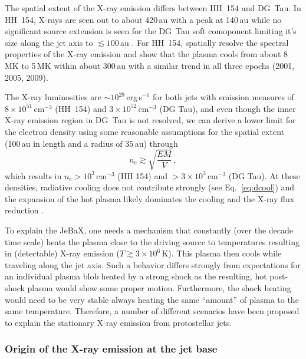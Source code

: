 The spatial extent of the X-ray emission differs between HH~154 and DG~Tau. In
HH~154, X-rays are seen out to about 420\,au with a peak at 140\,au \citep{Schneider_2011} while no significant source extension is seen for the DG~Tau soft comoponent limiting it's size along the jet axis to $\lesssim100\,$au \citep{Schneider_2008}. For HH~154, \citet{Schneider_2011} spatially resolve the spectral properties of the X-ray emission and show that the plasma cools from about 8\,MK to 5\,MK within about 300\,au with a similar trend in all three epochs (2001, 2005, 2009).


The X-ray luminosities are $\sim10^{29}$\,erg\,s$^{-1}$ for both jets with emission measures of $8\times10^{51}\,$cm$^{-3}$ (HH~154) and $3\times10^{52}$\,cm$^{-3}$ (DG Tau), and even though the inner X-ray emission region in DG~Tau is not resolved, we can derive a lower limit for the electron density using some reasonable assumptions for the spatial extent (100\,au in length and a radius of 35\,au) through 
\begin{equation}
n_e \gtrsim \sqrt{\frac{EM}{V}}\,,
\end{equation}
which results in $n_e>10^3\,$cm$^{-3}$  (HH 154) and $>3\times10^3\,$cm$^{-3}$ (DG Tau). At these densities, radiative cooling does not contribute strongly  (see Eq.~\ref{eq:dcool}) and  the expansion of the hot plasma likely dominates the cooling and the X-ray flux reduction \citep{Guedel_2008, Schneider_2011}. 

To explain the JeBaX, one needs a mechanism that constantly (over the decade time scale)  heats the plasma close to the driving source to temperatures resulting in (detectable) X-ray emission ($T\gtrsim3\times10^6$\,K). This plasma then cools while traveling along the jet axis. Such a behavior differs strongly from expectations for an individual plasma blob heated by a strong shock as the resulting, hot post-shock plasma would show some proper motion. Furthermore, the shock heating would need to be very stable always heating the same ``amount'' of plasma to the same temperature. Therefore, a number of different scenarios have been proposed to explain the stationary X-ray emission from protostellar jets.



\subsubsection{Origin of the X-ray emission at the jet base}



